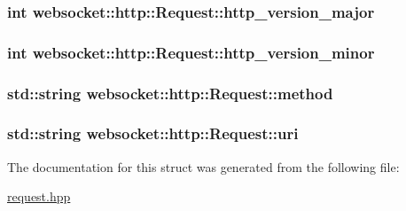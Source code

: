 \subsubsection[{\texorpdfstring{http\+\_\+version\+\_\+major}{http_version_major}}]{\setlength{\rightskip}{0pt plus 5cm}int websocket\+::http\+::\+Request\+::http\+\_\+version\+\_\+major}\hypertarget{structwebsocket_1_1http_1_1Request_a425abfd24de736ada49b1ac904316fa8}{}\label{structwebsocket_1_1http_1_1Request_a425abfd24de736ada49b1ac904316fa8}
\subsubsection[{\texorpdfstring{http\+\_\+version\+\_\+minor}{http_version_minor}}]{\setlength{\rightskip}{0pt plus 5cm}int websocket\+::http\+::\+Request\+::http\+\_\+version\+\_\+minor}\hypertarget{structwebsocket_1_1http_1_1Request_adc822c62d63286a9127d04d7d890148b}{}\label{structwebsocket_1_1http_1_1Request_adc822c62d63286a9127d04d7d890148b}
\subsubsection[{\texorpdfstring{method}{method}}]{\setlength{\rightskip}{0pt plus 5cm}std\+::string websocket\+::http\+::\+Request\+::method}\hypertarget{structwebsocket_1_1http_1_1Request_a698538be27d0b18b59c5caf1a0e3d495}{}\label{structwebsocket_1_1http_1_1Request_a698538be27d0b18b59c5caf1a0e3d495}
\subsubsection[{\texorpdfstring{uri}{uri}}]{\setlength{\rightskip}{0pt plus 5cm}std\+::string websocket\+::http\+::\+Request\+::uri}\hypertarget{structwebsocket_1_1http_1_1Request_a32fdc3e7be509b14c80a069dfbcf3b86}{}\label{structwebsocket_1_1http_1_1Request_a32fdc3e7be509b14c80a069dfbcf3b86}


The documentation for this struct was generated from the following file\+:\begin{DoxyCompactItemize}
\item 
\hyperlink{request_8hpp}{request.\+hpp}\end{DoxyCompactItemize}
